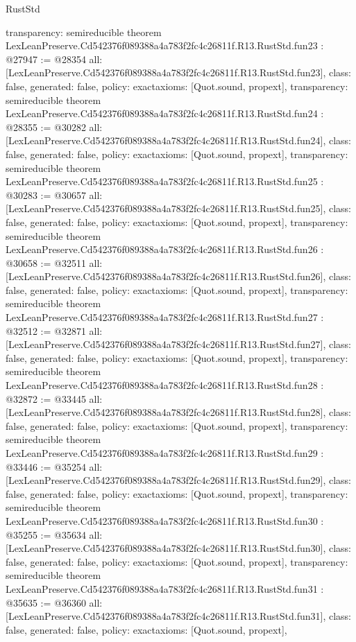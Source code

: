\begin{lexlean}{RustStd}
\begin{coremodule}
{  transparency: semireducible
}
theorem LexLeanPreserve.Cd542376f089388a4a783f2fc4c26811f.R13.RustStd.fun23 : @27947 := @28354 {
  all: [LexLeanPreserve.Cd542376f089388a4a783f2fc4c26811f.R13.RustStd.fun23],
  class: false,
  generated: false,
  policy: exact{axioms: [Quot.sound, propext]},
  transparency: semireducible
}
theorem LexLeanPreserve.Cd542376f089388a4a783f2fc4c26811f.R13.RustStd.fun24 : @28355 := @30282 {
  all: [LexLeanPreserve.Cd542376f089388a4a783f2fc4c26811f.R13.RustStd.fun24],
  class: false,
  generated: false,
  policy: exact{axioms: [Quot.sound, propext]},
  transparency: semireducible
}
theorem LexLeanPreserve.Cd542376f089388a4a783f2fc4c26811f.R13.RustStd.fun25 : @30283 := @30657 {
  all: [LexLeanPreserve.Cd542376f089388a4a783f2fc4c26811f.R13.RustStd.fun25],
  class: false,
  generated: false,
  policy: exact{axioms: [Quot.sound, propext]},
  transparency: semireducible
}
theorem LexLeanPreserve.Cd542376f089388a4a783f2fc4c26811f.R13.RustStd.fun26 : @30658 := @32511 {
  all: [LexLeanPreserve.Cd542376f089388a4a783f2fc4c26811f.R13.RustStd.fun26],
  class: false,
  generated: false,
  policy: exact{axioms: [Quot.sound, propext]},
  transparency: semireducible
}
theorem LexLeanPreserve.Cd542376f089388a4a783f2fc4c26811f.R13.RustStd.fun27 : @32512 := @32871 {
  all: [LexLeanPreserve.Cd542376f089388a4a783f2fc4c26811f.R13.RustStd.fun27],
  class: false,
  generated: false,
  policy: exact{axioms: [Quot.sound, propext]},
  transparency: semireducible
}
theorem LexLeanPreserve.Cd542376f089388a4a783f2fc4c26811f.R13.RustStd.fun28 : @32872 := @33445 {
  all: [LexLeanPreserve.Cd542376f089388a4a783f2fc4c26811f.R13.RustStd.fun28],
  class: false,
  generated: false,
  policy: exact{axioms: [Quot.sound, propext]},
  transparency: semireducible
}
theorem LexLeanPreserve.Cd542376f089388a4a783f2fc4c26811f.R13.RustStd.fun29 : @33446 := @35254 {
  all: [LexLeanPreserve.Cd542376f089388a4a783f2fc4c26811f.R13.RustStd.fun29],
  class: false,
  generated: false,
  policy: exact{axioms: [Quot.sound, propext]},
  transparency: semireducible
}
theorem LexLeanPreserve.Cd542376f089388a4a783f2fc4c26811f.R13.RustStd.fun30 : @35255 := @35634 {
  all: [LexLeanPreserve.Cd542376f089388a4a783f2fc4c26811f.R13.RustStd.fun30],
  class: false,
  generated: false,
  policy: exact{axioms: [Quot.sound, propext]},
  transparency: semireducible
}
theorem LexLeanPreserve.Cd542376f089388a4a783f2fc4c26811f.R13.RustStd.fun31 : @35635 := @36360 {
  all: [LexLeanPreserve.Cd542376f089388a4a783f2fc4c26811f.R13.RustStd.fun31],
  class: false,
  generated: false,
  policy: exact{axioms: [Quot.sound, propext]},
}
\end{coremodule}
\end{lexlean}
